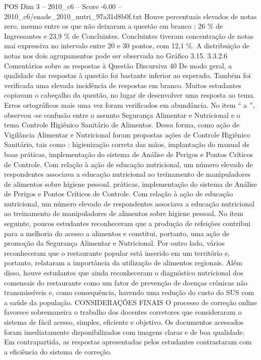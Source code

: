 \begin{textsample}{POS Dim 3 – 2010\_c6 – Score -6.00 – 2010\_c6/enade\_2010\_nutri\_97a31d8b0f.txt}
Houve percentuais elevados de notas zero, mesmo entre os que não deixaram a questão em branco : 26 \% de Ingressantes e 23,9 \% de Concluintes.
Concluintes tiveram concentração de notas mai expressiva no intervalo entre 20 e 30 pontos, com 12,1 \%.
A distribuição de notas nos dois agrupamentos pode ser observada no Gráfico 3.15. 3.3.2.6 Comentários sobre as respostas à Questão Discursiva 40 De modo geral, a qualidade das respostas à questão foi bastante inferior ao esperado.
Também foi verificada uma elevada incidência de respostas em branco.
Muitos estudantes copiavam o cabeçalho da questão, no lugar de desenvolver uma resposta ao tema.
Erros ortográficos mais uma vez foram verificados em abundância.
No item “ a ”, observou -se confusão entre o assunto Segurança Alimentar e Nutricional e o tema Controle Higiênico Sanitário de Alimentos.
Dessa forma, como ação de Vigilância Alimentar e Nutricional foram propostas ações de Controle Higiênico Sanitário, tais como : higienização correta das mãos, implantação do manual de boas práticas, implementação do sistema de Análise de Perigos e Pontos Críticos de Controle.
Com relação à ação de educação nutricional, um número elevado de respondentes associava a educação nutricional ao treinamento de manipuladores de alimentos sobre higiene pessoal. práticas, implementação do sistema de Análise de Perigos e Pontos Críticos de Controle.
Com relação à ação de educação nutricional, um número elevado de respondentes associava a educação nutricional ao treinamento de manipuladores de alimentos sobre higiene pessoal.
No item seguinte, poucos estudantes reconheceram que a produção de refeições contribui para a melhoria do acesso a alimentos e constitui, portanto, uma ação de promoção da Segurança Alimentar e Nutricional.
Por outro lado, vários reconheceram que o restaurante popular está inserido em um território e, portanto, relataram a importância da utilização de alimentos regionais.
Além disso, houve estudantes que ainda reconheceram o diagnóstico nutricional dos comensais do restaurante como um fator de prevenção de doenças crônicas não transmissíveis e, como consequência, havendo uma redução do custo do SUS com a saúde da população.
CONSIDERAÇÕES FINAIS O processo de correção online favorece sobremaneira o trabalho dos docentes corretores que consideraram o sistema de fácil acesso, simples, eficiente e objetivo.
Os documentos acessados foram imediatamente disponibilizados com imagens claras e de boa qualidade.
Em contrapartida, as respostas apresentadas pelos estudantes contrastaram com a eficiência do sistema de correção.

\end{textsample}
